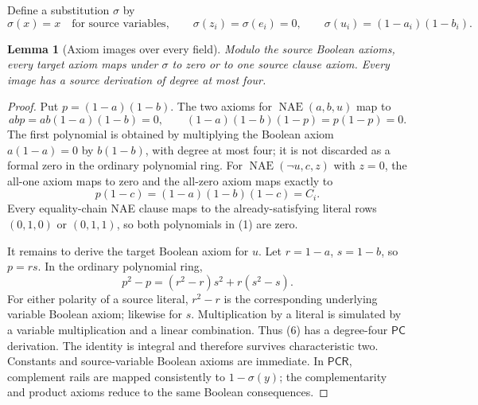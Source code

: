 \documentclass[11pt]{article}
\newtheorem{lemma}[theorem]{Lemma}
\newcommand{\PC}{\ensuremath{\mathsf{PC}}}
\newcommand{\PCR}{\ensuremath{\mathsf{PCR}}}
\begin{document}
Define a substitution $\sigma$ by
\[
\sigma(x)=x\quad\text{for source variables},\qquad
\sigma(z_i)=\sigma(e_i)=0,
\qquad
\sigma(u_i)=(1-a_i)(1-b_i).                     \tag{3}
\]

\begin{lemma}[Axiom images over every field]\label{lem:axioms}
Modulo the source Boolean axioms, every target axiom maps under $\sigma$ to
zero or to one source clause axiom.  Every image has a source derivation of
degree at most four.
\end{lemma}
\begin{proof}
Put $p=(1-a)(1-b)$.  The two axioms for $\operatorname{NAE}(a,b,u)$
map to
\[
abp=ab(1-a)(1-b)=0,
\qquad
(1-a)(1-b)(1-p)=p(1-p)=0.                       \tag{4}
\]
The first polynomial is obtained by multiplying the Boolean axiom
$a(1-a)=0$ by $b(1-b)$, with degree at most four; it is not discarded as a
formal zero in the ordinary polynomial ring.
For $\operatorname{NAE}(\neg u,c,z)$ with $z=0$, the all-one axiom
maps to zero and the all-zero axiom maps exactly to
\[
p(1-c)=(1-a)(1-b)(1-c)=C_i.                     \tag{5}
\]
Every equality-chain NAE clause maps to the already-satisfying literal rows
$(0,1,0)$ or $(0,1,1)$, so both polynomials in (1) are zero.

It remains to derive the target Boolean axiom for $u$.  Let
$r=1-a$, $s=1-b$, so $p=rs$.  In the ordinary polynomial ring,
\[
p^2-p=(r^2-r)s^2+r(s^2-s).                       \tag{6}
\]
For either polarity of a source literal, $r^2-r$ is the corresponding
underlying variable Boolean axiom; likewise for $s$.  Multiplication by a
literal is simulated by a variable multiplication and a linear combination.
Thus (6) has a degree-four \PC{} derivation.  The identity is integral and
therefore survives characteristic two.  Constants and source-variable Boolean
axioms are immediate.  In \PCR{}, complement rails are mapped consistently
to $1-\sigma(y)$; the complementarity and product axioms reduce to the same
Boolean consequences.
\end{proof}
\end{document}
